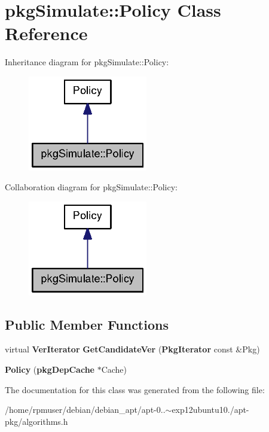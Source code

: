\section{pkg\-Simulate\-:\-:\-Policy \-Class \-Reference}
\label{classpkgSimulate_1_1Policy}


\-Inheritance diagram for pkg\-Simulate\-:\-:\-Policy\-:
\nopagebreak
\begin{figure}[H]
\begin{center}
\leavevmode
\includegraphics[width=148pt]{classpkgSimulate_1_1Policy__inherit__graph}
\end{center}
\end{figure}


\-Collaboration diagram for pkg\-Simulate\-:\-:\-Policy\-:
\nopagebreak
\begin{figure}[H]
\begin{center}
\leavevmode
\includegraphics[width=148pt]{classpkgSimulate_1_1Policy__coll__graph}
\end{center}
\end{figure}
\subsection*{\-Public \-Member \-Functions}
\begin{DoxyCompactItemize}
\item 
virtual {\bf \-Ver\-Iterator} {\bfseries \-Get\-Candidate\-Ver} ({\bf \-Pkg\-Iterator} const \&\-Pkg)\label{classpkgSimulate_1_1Policy_a19accc4f28e2cfc71b57aaf0ffcb9d95}

\item 
{\bfseries \-Policy} ({\bf pkg\-Dep\-Cache} $\ast$\-Cache)\label{classpkgSimulate_1_1Policy_ac7005f1179db07d107334201f56a84c2}

\end{DoxyCompactItemize}


\-The documentation for this class was generated from the following file\-:\begin{DoxyCompactItemize}
\item 
/home/rpmuser/debian/debian\-\_\-apt/apt-\/0..$\sim$exp12ubuntu10./apt-\/pkg/algorithms.\-h\end{DoxyCompactItemize}
